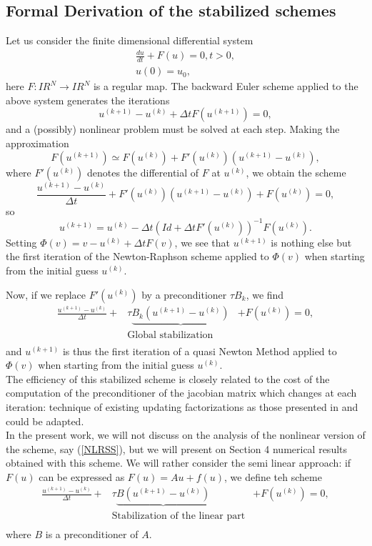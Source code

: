 \documentclass[11pt]{article}
\newcommand{\R}{I\!\!R}
\newcommand{\Frac}[2] {\frac{\textstyle #1} {\textstyle #2}}
\begin{document}
{\subsection{Formal Derivation of the stabilized schemes}
Let us consider the finite dimensional differential system
\begin{eqnarray}
\Frac{du}{dt}+F(u)=0, t>0,\\
u(0)=u_0,
\end{eqnarray}
here $F : \R^N\rightarrow \R^N$ is a regular map. The backward Euler
scheme applied to the above system generates the iterations
$$
u^{(k+1)}-u^{(k)}+\Delta tF(u^{(k+1)})=0,
$$
and a (possibly) nonlinear problem must be solved at each step. Making
the approximation
$$
F(u^{(k+1)})\simeq F(u^{(k)}) +F'(u^{(k)})(u^{(k+1)}-u^{(k)}),
$$
where $F'(u^{(k)})$ denotes the differential of $F$ at $u^{(k)}$, we obtain the scheme
$$
\Frac{u^{(k+1)}-u^{(k)}}{\Delta t} + F'(u^{(k)})(u^{(k+1)}-u^{(k)})
+F(u^{(k)})=0,
$$
so
$$
u^{(k+1)}=u^{(k)}-\Delta t(Id +\Delta tF'(u^{(k)}))^{-1}F(u^{(k)}).
$$
Setting $\Phi(v)=v-u^{(k)}+\Delta tF(v)$, we see that $u^{(k+1)}$
is nothing else but the first iteration of the Newton-Raphson scheme
applied to $\Phi(v)$ when starting from the initial guess $u^{(k)}$.

Now, if we replace  $F'(u^{(k)})$ by a preconditioner $\tau B_k$, we
find
\begin{equation}
\begin{array}{lll}
\Frac{u^{(k+1)}-u^{(k)}}{\Delta t}+&\tau
\underbrace{B_k(u^{(k+1)}-u^{(k)})}&+F(u^{(k)})=0,\\
&\mbox{Global stabilization}& \\
\end{array}
\label{NLRSS1}
\end{equation}
and $u^{(k+1)}$ is thus the first iteration of a quasi Newton Method
applied to $\Phi(v)$ when starting from the initial guess $u^{(k)}$.\\

The efficiency of this stabilized scheme is closely related to the
cost of the computation of the preconditioner of the jacobian matrix which
changes at each iteration: technique of existing updating 
factorizations as those presented in \cite{CalgaroChehabSaad} and \cite {Bellavia} could
be adapted.\\

In the present work, we will not discuss on the analysis of the nonlinear version of the scheme, say (\ref{NLRSS}), but we will present on Section 4 numerical results obtained with this scheme. We will rather consider the semi linear approach: if $F(u)$ can be expressed as $F(u)=Au+f(u)$, we define teh scheme
\begin{equation}
\begin{array}{lll}
\Frac{u^{(k+1)}-u^{(k)}}{\Delta t}+&\tau
\underbrace{B(u^{(k+1)}-u^{(k)})}&+F(u^{(k)})=0,\\
&\mbox{Stabilization of the linear part}&\\
\end{array}
\label{NLRSS}
\end{equation}
where $B$ is a preconditioner of $A$.\\

}
\end{document}
